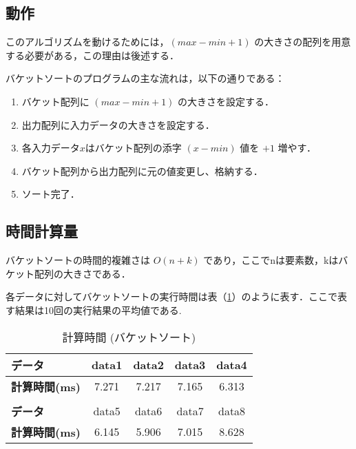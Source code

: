\documentclass[a4j, titlepage]{jarticle}
\begin{document}
        \subsection{動作}
            このアルゴリズムを動けるためには，$(max - min + 1)$ の大きさの配列を用意する必要がある，この理由は後述する．
            
            バケットソートのプログラムの主な流れは，以下の通りである：
            \begin{screen}
                \begin{enumerate}
                    \item バケット配列に $(max - min + 1)$ の大きさを設定する．
                    \item 出力配列に入力データの大きさを設定する．
                    \item 各入力データ$x$はバケット配列の添字 $(x - min)$ 値を $+1$ 増やす．
                    \item バケット配列から出力配列に元の値変更し、格納する．
                    \item ソート完了．
                \end{enumerate}    
            \end{screen}

        \subsection{時間計算量}
            バケットソートの時間的複雑さは $O(n + k)$ であり，ここでnは要素数，kはバケット配列の大きさである．

            各データに対してバケットソートの実行時間は表（\ref{tab:bucket}）のように表す．ここで表す結果は10回の実行結果の平均値である.

            \begin{table}[tbh]
                \caption{計算時間 (バケットソート)}
                \label{tab:bucket}
                \begin{center}
                    \begin{tabular}{lcccc}
                        \hline
                        \textbf{データ} & data1 & data2 &data3 &data4\\ \hline
                        \textbf{計算時間(ms)} & 7.271 & 7.217 & 7.165 & 6.313 \\\hline
                        \\ \hline
                        \textbf{データ} &data5 &data6 &data7 &data8\\ \hline
                        \textbf{計算時間(ms)} & 6.145 & 5.906 & 7.015 & 8.628\\ \hline
                    \end{tabular}
                \end{center}
            \end{table}
\end{document}
